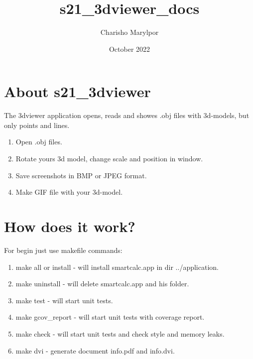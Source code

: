 \documentclass[12pt, letterpaper]{article}
\title{s21\_3dviewer\_docs}
\author{Charisho Marylpor}
\date{October 2022}
\begin{document}
\maketitle

\section*{About s21\_3dviewer}

The 3dviewer application opens, reads and showes .obj files with 3d-models, but only points and lines.

\begin{enumerate}
    \item Open .obj files.
    \item Rotate yours 3d model, change scale and position in window.
    \item Save screenshots in BMP or JPEG format.
    \item Make GIF file with your 3d-model.
\end{enumerate}

\section*{How does it work?}

For begin just use makefile commands:

\begin{enumerate}
    \item make all or install - will install smartcalc.app in dir ../application.
    \item make uninstall - will delete smartcalc.app and his folder.
    \item make test - will start unit tests.
    \item make gcov\_report - will start unit tests with coverage report.
    \item make check - will start unit tests and check style and memory leaks.
    \item make dvi - generate document info.pdf and info.dvi.
\end{enumerate}
\end{document}
